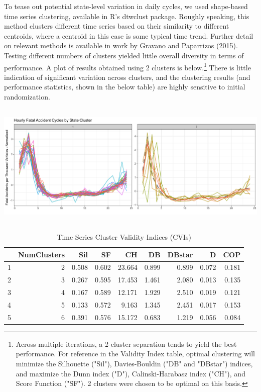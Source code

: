 \documentclass[11pt, oneside,titlepage]{article}   	%
\begin{document}
To tease out potential state-level variation in daily cycles, we used shape-based time series clustering, available in R's dtwclust package. Roughly speaking, this method clusters different time series based on their similarity to different centroids, where a centroid in this case is some typical time trend. Further detail on relevant methods is available in work by Gravano and Paparrizos (2015). Testing different numbers of clusters yielded little overall diversity in terms of performance. A plot of results obtained using 2 clusters is below.\footnote{Across multiple iterations, a 2-cluster separation tends to yield the best performance. For reference in the Validity Index table, optimal clustering will minimize the Silhouette ("Sil"), Davies-Bouldin ("DB" and "DBstar") indices, and maximize the Dunn index ("D"), Calinski-Harabasz index ("CH"), and Score Function ("SF"). 2 clusters were chosen to be optimal on this basis.} There is little indication of significant variation across clusters, and the clustering results (and performance statistics, shown in the below table) are highly sensitive to initial randomization. 

\begin{center}
\includegraphics[width=.75\textwidth,height=6cm,keepaspectratio]{StateClusterPlot_Hourly.png}
\end{center}

\begin{table}[H]
\centering
\begin{tabular}{rrrrrrrrr}
  \hline
 & NumClusters & Sil & SF & CH & DB & DBstar & D & COP \\ 
  \hline
1 & 2 & 0.508 & 0.602 & 23.664 & 0.899 & 0.899 & 0.072 & 0.181 \\ 
  2 & 3 & 0.267 & 0.595 & 17.453 & 1.461 & 2.080 & 0.013 & 0.135 \\ 
  3 & 4 & 0.167 & 0.589 & 12.171 & 1.929 & 2.510 & 0.019 & 0.121 \\ 
  4 & 5 & 0.133 & 0.572 & 9.163 & 1.345 & 2.451 & 0.017 & 0.153 \\ 
  5 & 6 & 0.391 & 0.576 & 15.172 & 0.683 & 1.219 & 0.056 & 0.084 \\ 
   \hline
\end{tabular}
\caption{Time Series Cluster Validity Indices (CVIs)} 
\end{table}
\end{document}

